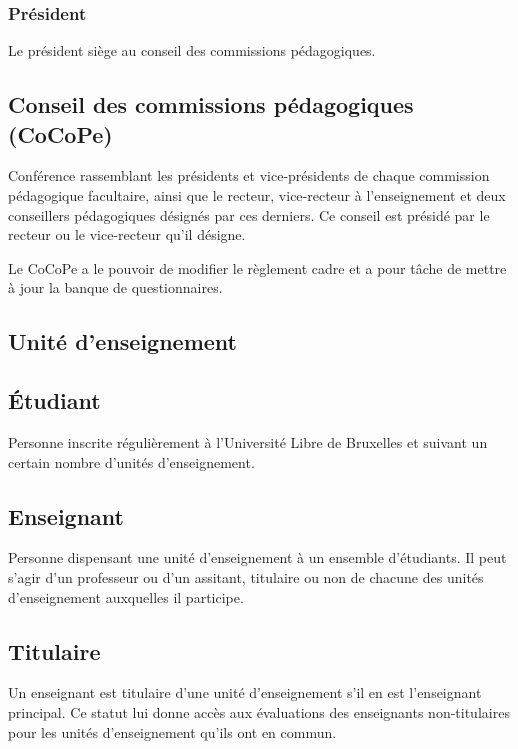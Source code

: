 \documentclass[a4paper,11pt]{report}
\begin{document}
\subsubsection{Président}
Le président siège au conseil des commissions pédagogiques.

\subsection{Conseil des commissions pédagogiques (CoCoPe)}
Conférence rassemblant les présidents et vice-présidents de chaque commission pédagogique facultaire, ainsi que le recteur, vice-recteur à l'enseignement et deux conseillers pédagogiques désignés par ces derniers.
Ce conseil est présidé par le recteur ou le vice-recteur qu'il désigne.

Le CoCoPe a le pouvoir de modifier le règlement cadre et a pour tâche de mettre à jour la banque de questionnaires.


\subsection{Unité d'enseignement}

\subsection{Étudiant}
Personne inscrite régulièrement à l'Université Libre de Bruxelles et suivant un certain nombre d'unités d'enseignement.

\subsection{Enseignant}
Personne dispensant une unité d'enseignement à un ensemble d'étudiants.
Il peut s'agir d'un professeur ou d'un assitant, titulaire ou non de chacune des unités d'enseignement auxquelles il participe.

\subsection{Titulaire}
Un enseignant est titulaire d'une unité d'enseignement s'il en est l'enseignant principal.
Ce statut lui donne accès aux évaluations des enseignants non-titulaires pour les unités d'enseignement qu'ils ont en commun.
\end{document}
